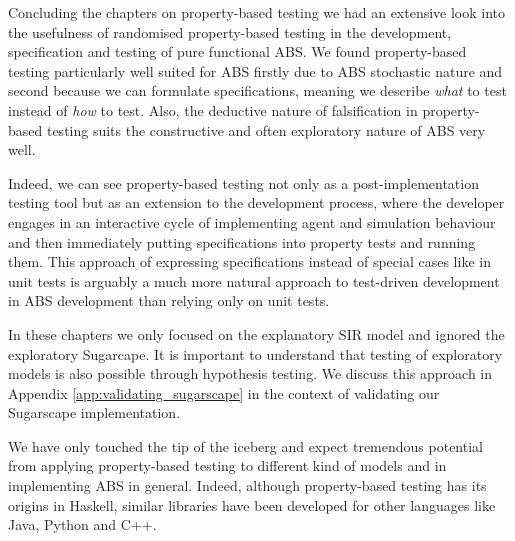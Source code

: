 \medskip

Concluding the chapters on property-based testing we had an extensive look into the usefulness of randomised property-based testing in the development, specification and testing of pure functional ABS. We found property-based testing particularly well suited for ABS firstly due to ABS stochastic nature and second because we can formulate specifications, meaning we describe \textit{what} to test instead of \textit{how} to test. Also, the deductive nature of falsification in property-based testing suits the constructive and often exploratory nature of ABS very well. 

Indeed, we can see property-based testing not only as a post-implementation testing tool but as an extension to the development process, where the developer engages in an interactive cycle of implementing agent and simulation behaviour and then immediately putting specifications into property tests and running them. This approach of expressing specifications instead of special cases like in unit tests is arguably a much more natural approach to test-driven development in ABS development than relying only on unit tests.

In these chapters we only focused on the explanatory SIR model and ignored the exploratory Sugarcape. It is important to understand that testing of exploratory models is also possible through hypothesis testing. We discuss this approach in Appendix \ref{app:validating_sugarscape} in the context of validating our Sugarscape implementation.

We have only touched the tip of the iceberg and expect tremendous potential from applying property-based testing to different kind of models and in implementing ABS in general. Indeed, although property-based testing has its origins in Haskell, similar libraries have been developed for other languages like Java, Python and C++.
